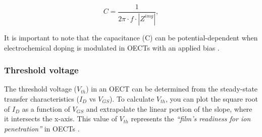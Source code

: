 \begin{equation} \label{eq:C}
	C = \frac{1}{2\pi \cdot f \cdot |Z^{img}|},
\end{equation}

It is important to note that the capacitance (C) can be potential-dependent when electrochemical doping is modulated in OECTs with an applied bias %
\cite{inalBenchmarkingOrganicMixed2017}.

\subsubsection{Threshold voltage}

The threshold voltage ($V_{th}$) in an OECT can be determined from the steady-state transfer characteristics ($I_{D}$ vs $V_{GS}$). To calculate $V_{th}$, you can plot the square root of $I_{D}$ as a function of $V_{GS}$ and extrapolate the linear portion of the slope, where it intersects the x-axis. This value of $V_{th}$ represents the \textit{``film's readiness for ion penetration''} in OECTs \cite{ohayonGuideCharacterizationOrganic2023}.

